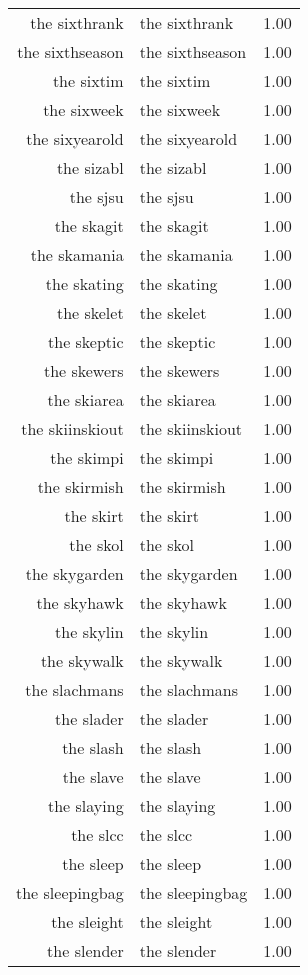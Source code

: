 \begin{table}[ht]
\begin{tabular}{rlr}
  the sixthrank & the sixthrank & 1.00 \\ 
  the sixthseason & the sixthseason & 1.00 \\ 
  the sixtim & the sixtim & 1.00 \\ 
  the sixweek & the sixweek & 1.00 \\ 
  the sixyearold & the sixyearold & 1.00 \\ 
  the sizabl & the sizabl & 1.00 \\ 
  the sjsu & the sjsu & 1.00 \\ 
  the skagit & the skagit & 1.00 \\ 
  the skamania & the skamania & 1.00 \\ 
  the skating & the skating & 1.00 \\ 
  the skelet & the skelet & 1.00 \\ 
  the skeptic & the skeptic & 1.00 \\ 
  the skewers & the skewers & 1.00 \\ 
  the skiarea & the skiarea & 1.00 \\ 
  the skiinskiout & the skiinskiout & 1.00 \\ 
  the skimpi & the skimpi & 1.00 \\ 
  the skirmish & the skirmish & 1.00 \\ 
  the skirt & the skirt & 1.00 \\ 
  the skol & the skol & 1.00 \\ 
  the skygarden & the skygarden & 1.00 \\ 
  the skyhawk & the skyhawk & 1.00 \\ 
  the skylin & the skylin & 1.00 \\ 
  the skywalk & the skywalk & 1.00 \\ 
  the slachmans & the slachmans & 1.00 \\ 
  the slader & the slader & 1.00 \\ 
  the slash & the slash & 1.00 \\ 
  the slave & the slave & 1.00 \\ 
  the slaying & the slaying & 1.00 \\ 
  the slcc & the slcc & 1.00 \\ 
  the sleep & the sleep & 1.00 \\ 
  the sleepingbag & the sleepingbag & 1.00 \\ 
  the sleight & the sleight & 1.00 \\ 
  the slender & the slender & 1.00 \\ 

\end{tabular}
\end{table}
